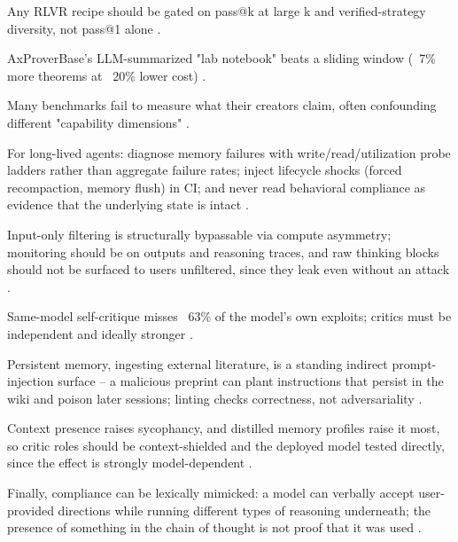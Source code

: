 Any RLVR recipe should be gated on pass@k at large k and verified-strategy diversity, not pass@1 alone \cite{2605.27878}.

AxProverBase's LLM-summarized "lab notebook" beats a sliding window (~7\% more theorems at ~20\% lower cost) \cite{2602.24273}.

Many benchmarks fail to measure what their creators claim, often confounding different "capability dimensions" \cite{Zhou2026}.

For long-lived agents: diagnose memory failures with write/read/utilization probe ladders rather than aggregate failure rates; inject lifecycle shocks (forced recompaction, memory flush) in CI; and never read behavioral compliance as evidence that the underlying state is intact \cite{2605.26302}.

Input-only filtering is structurally bypassable via compute asymmetry; monitoring should be on outputs and reasoning traces, and raw thinking blocks should not be surfaced to users unfiltered, since they leak even without an attack \cite{2510.01529}.

Same-model self-critique misses ~63\% of the model's own exploits; critics must be independent and ideally stronger \cite{2606.04075}.

Persistent memory, ingesting external literature, is a standing indirect prompt-injection surface -- a malicious preprint can plant instructions that persist in the wiki and poison later sessions; linting checks correctness, not adversariality \cite{karpathy2026llmwiki}.

Context presence raises sycophancy, and distilled memory profiles raise it most, so critic roles should be context-shielded and the deployed model tested directly, since the effect is strongly model-dependent \cite{Jain2026}.

Finally, compliance can be lexically mimicked: a model can verbally accept user-provided directions while running different types of reasoning underneath; the presence of something in the chain of thought is not proof that it was used \cite{2604.27251}.